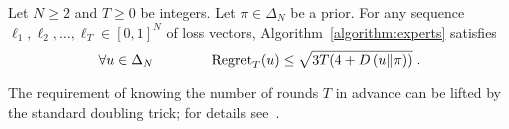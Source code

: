 \begin{theorem}
\label{theorem:experts-regret}
Let $N \ge 2$ and $T \ge 0$ be integers. Let $\pi \in \Delta_N$ be a prior.
For any sequence $\ell_1, \ell_2, \dots, \ell_T \in
[0,1]^N$ of loss vectors, Algorithm~\ref{algorithm:experts}
satisfies
$$
\forall u \in \Delta_N \qquad \qquad \operatorname{Regret}_T(u) \le \sqrt{3T (4 + D\left({u}\middle\|{\pi}\right))} \; .
$$
\end{theorem}

The requirement of knowing the number of rounds $T$ in advance can be lifted by
the standard doubling trick; for details
see~\cite{Orabona-Pal-2016-parameter-free}.


